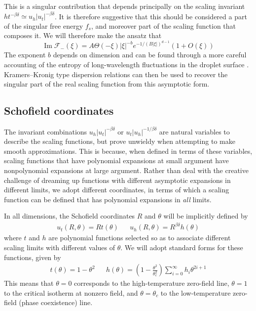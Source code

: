 \documentclass[
  aps,
  prb,
  reprint,
  longbibliography,
  floatfix
]{revtex4-2}
\begin{document}
This is a singular contribution that depends principally on the scaling
invariant $ht^{-\beta\delta}\simeq u_h|u_t|^{-\beta\delta}$. It is therefore
suggestive that this should be considered a part of the singular free energy
$f_s$, and moreover part of the scaling function that composes it. We will therefore make the ansatz that
\begin{equation}
  \operatorname{Im}\mathcal F_-(\xi)=A\Theta(-\xi)|\xi|^{-b}e^{-1/(B|\xi|)^{d-1}}\left(1+O(\xi)\right)
\end{equation}
\cite{Houghton_1980_The}
The exponent $b$ depends on dimension and can be found through a more careful
accounting of the entropy of long-wavelength fluctuations in the droplet
surface \cite{Gunther_1980_Goldstone}.
Kramers--Kronig type dispersion relations can then be used to recover the
singular part of the real scaling function from this asymptotic form.

\subsection{Schofield coordinates}

The invariant combinations $u_h|u_t|^{-\beta\delta}$ or
$u_t|u_h|^{-1/\beta\delta}$ are natural variables to describe the scaling
functions, but prove unwieldy when attempting to make smooth approximations.
This is because, when defined in terms of these variables, scaling functions
that have polynomial expansions at small argument have nonpolynomial expansions
at large argument. Rather than deal with the creative challenge of dreaming up
functions with different asymptotic expansions in different limits, we adopt
different coordinates, in terms of which a scaling function can be defined that
has polynomial expansions in \emph{all} limits.

In all dimensions, the Schofield coordinates $R$ and $\theta$ will be implicitly defined by
\begin{align} \label{eq:schofield}
  u_t(R, \theta) = Rt(\theta)
  &&
  u_h(R, \theta) = R^{\beta\delta}h(\theta)
\end{align}
where $t$ and $h$ are polynomial functions selected so as to associate different scaling limits with different values of $\theta$. We will adopt standard forms for these functions, given by
\begin{align} \label{eq:schofield.funcs}
  t(\theta)=1-\theta^2
  &&
  h(\theta)=\left(1-\frac{\theta^2}{\theta_c^2}\right)\sum_{i=0}^\infty h_i\theta^{2i+1}
\end{align}
This means that $\theta=0$ corresponds to the high-temperature zero-field line,
$\theta=1$ to the critical isotherm at nonzero field, and $\theta=\theta_c$ to
the low-temperature zero-field (phase coexistence) line.
\end{document}
